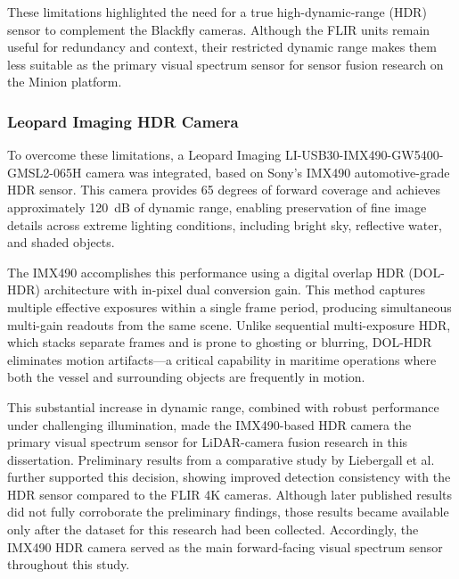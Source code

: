 \documentclass{erauthesis}
\begin{document}
These limitations highlighted the need for a true high-dynamic-range (HDR) sensor to complement the Blackfly cameras.  
Although the FLIR units remain useful for redundancy and context, their restricted dynamic range makes them less suitable as the primary visual spectrum sensor for sensor fusion research on the Minion platform.  

\subsubsection{Leopard Imaging HDR Camera}

To overcome these limitations, a Leopard Imaging LI-USB30-IMX490-GW5400-GMSL2-065H camera was integrated, based on Sony’s IMX490 automotive-grade HDR sensor.  
This camera provides 65 degrees of forward coverage and achieves approximately 120~dB of dynamic range, enabling preservation of fine image details across extreme lighting conditions, including bright sky, reflective water, and shaded objects.  

The IMX490 accomplishes this performance using a digital overlap HDR (DOL-HDR) architecture with in-pixel dual conversion gain.  
This method captures multiple effective exposures within a single frame period, producing simultaneous multi-gain readouts from the same scene.  
Unlike sequential multi-exposure HDR, which stacks separate frames and is prone to ghosting or blurring, DOL-HDR eliminates motion artifacts—a critical capability in maritime operations where both the vessel and surrounding objects are frequently in motion.  

This substantial increase in dynamic range, combined with robust performance under challenging illumination, made the IMX490-based HDR camera the primary visual spectrum sensor for \ac{LiDAR}-camera fusion research in this dissertation.  
Preliminary results from a comparative study by Liebergall et al.~\cite{liebergall} further supported this decision, showing improved detection consistency with the HDR sensor compared to the FLIR 4K cameras.  
Although later published results did not fully corroborate the preliminary findings, those results became available only after the dataset for this research had been collected.  
Accordingly, the IMX490 HDR camera served as the main forward-facing visual spectrum sensor throughout this study.  
\end{document}
